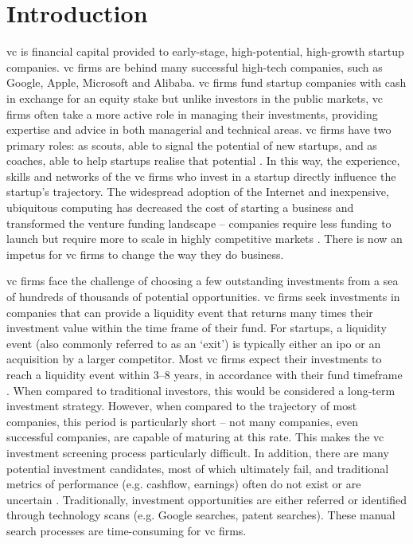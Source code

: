 \documentclass[../thesis/thesis.tex]{subfiles}
\begin{document}
\chapter{Introduction}
\label{chap:introduction}

\Gls{vc} is financial capital provided to early-stage, high-potential, high-growth startup companies. \Gls{vc} firms are behind many successful high-tech companies, such as Google, Apple, Microsoft and Alibaba. \Gls{vc} firms fund startup companies with cash in exchange for an equity stake but unlike investors in the public markets, \gls{vc} firms often take a more active role in managing their investments, providing expertise and advice in both managerial and technical areas. \Gls{vc} firms have two primary roles: as scouts, able to signal the potential of new startups, and as coaches, able to help startups realise that potential \cite{baum2004}. In this way, the experience, skills and networks of the \gls{vc} firms who invest in a startup directly influence the startup’s trajectory. The widespread adoption of the Internet and inexpensive, ubiquitous computing has decreased the cost of starting a business and transformed the venture funding landscape -- companies require less funding to launch but require more to scale in highly competitive markets \cite{graham2013}. There is now an impetus for \gls{vc} firms to change the way they do business.

\Gls{vc} firms face the challenge of choosing a few outstanding investments from a sea of hundreds of thousands of potential opportunities. \Gls{vc} firms seek investments in companies that can provide a liquidity event that returns many times their investment value within the time frame of their fund. For startups, a liquidity event (also commonly referred to as an `exit’) is typically either an \gls{ipo} or an acquisition by a larger competitor. Most \gls{vc} firms expect their investments to reach a liquidity event within 3--8 years, in accordance with their fund timeframe \cite{CITE}. When compared to traditional investors, this would be considered a long-term investment strategy. However, when compared to the trajectory of most companies, this period is particularly short -- not many companies, even successful companies, are capable of maturing at this rate. This makes the \gls{vc} investment screening process particularly difficult. In addition, there are many potential investment candidates, most of which ultimately fail, and traditional metrics of performance (e.g. cashflow, earnings) often do not exist or are uncertain \cite{shane2002}. Traditionally, investment opportunities are either referred or identified through technology scans (e.g. Google searches, patent searches). These manual search processes are time-consuming for \gls{vc} firms.
\end{document}
